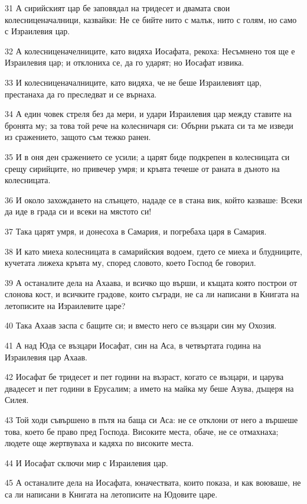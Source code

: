 \par 31 А сирийският цар бе заповядал на тридесет и двамата свои колесниценачалници, казвайки: Не се бийте нито с малък, нито с голям, но само с Израилевия цар.
\par 32 А колесниценачелниците, като видяха Иосафата, рекоха: Несъмнено тоя ще е Израилевия цар; и отклониха се, да го ударят; но Иосафат извика.
\par 33 И колесниценачалниците, като видяха, че не беше Израилевият цар, престанаха да го преследват и се върнаха.
\par 34 А един човек стреля без да мери, и удари Израилевия цар между ставите на бронята му; за това той рече на колесничаря си: Обърни ръката си та ме изведи из сражението, защото съм тежко ранен.
\par 35 И в оня ден сражението се усили; а царят биде подкрепен в колесницата си срещу сирийците, но привечер умря; и кръвта течеше от раната в дъното на колесницата.
\par 36 И около захождането на слънцето, нададе се в стана вик, който казваше: Всеки да иде в града си и всеки на мястото си!
\par 37 Така царят умря, и донесоха в Самария, и погребаха царя в Самария.
\par 38 И като миеха колесницата в самарийския водоем, гдето се миеха и блудниците, кучетата лижеха кръвта му, според словото, което Господ бе говорил.
\par 39 А останалите дела на Ахаава, и всичко що върши, и къщата която построи от слонова кост, и всичките градове, които съгради, не са ли написани в Книгата на летописите на Израилевите царе?
\par 40 Така Ахаав заспа с бащите си; и вместо него се възцари син му Охозия.
\par 41 А над Юда се възцари Иосафат, син на Аса, в четвъртата година на Израилевия цар Ахаав.
\par 42 Иосафат бе тридесет и пет години на възраст, когато се възцари, и царува двадесет и пет години в Ерусалим; а името на майка му беше Азува, дъщеря на Силея.
\par 43 Той ходи съвършено в пътя на баща си Аса: не се отклони от него а вършеше това, което бе право пред Господа. Високите места, обаче, не се отмахнаха; людете още жертвуваха и кадяха по високите места.
\par 44 И Иосафат сключи мир с Израилевия цар.
\par 45 А останалите дела на Иосафата, юначествата, които показа, и как воюваше, не са ли написани в Книгата на летописите на Юдовите царе.
